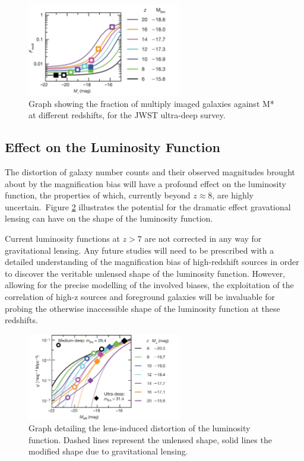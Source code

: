 		\begin{figure}
			\centering
			\includegraphics[width=0.6\textwidth]{../Images/gravjwst1.JPG}
			\caption{Graph showing the fraction of multiply imaged galaxies against M* at different redshifts, for the JWST ultra-deep survey.}\label{fig:gravjwst1}
		\end{figure}

	\subsection{Effect on the Luminosity Function} %
	\label{sub:effect_on_the_luminosity_function}
		The distortion of galaxy number counts and their observed magnitudes brought about by the magnification bias will have a profound effect on the luminosity function, the properties of which, currently beyond $z\approx8$, are highly uncertain.~Figure \ref{fig:gravlumfun} illustrates the potential for the dramatic effect gravational lensing can have on the shape of the luminosity function.

		Current luminosity functions at $z>7$ are not corrected in any way for gravitational lensing. Any future studies will need to be prescribed with a detailed understanding of the magnification bias of high-redshift sources in order to discover the veritable unlensed shape of the luminosity function. However, allowing for the precise modelling of the involved biases, the exploitation of the correlation of high-z sources and foreground galaxies will be invaluable for probing the otherwise inaccessible shape of the luminosity function at these redshifts.
		\begin{figure}
			\centering
			\includegraphics[width=0.6\textwidth]{../Images/gravlumfun.JPG}
			\caption{Graph detailing the lens-induced distortion of the luminosity function. Dashed lines represent the unlensed shape, solid lines the modified shape due to gravitational lensing.}\label{fig:gravlumfun}
		\end{figure}





